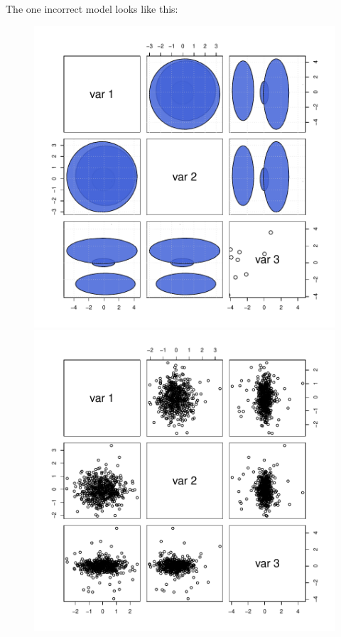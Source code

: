 The one incorrect model looks like this:

\begin{figure}[h]
    \centering
    \begin{minipage}{0.45\textwidth}
        \centering
\includegraphics{chapter3-figerrorMW215}
    \end{minipage}
    \begin{minipage}{0.45\textwidth}
        \centering
\includegraphics{chapter3-figerrorMW215x}
    \end{minipage}
\end{figure}

